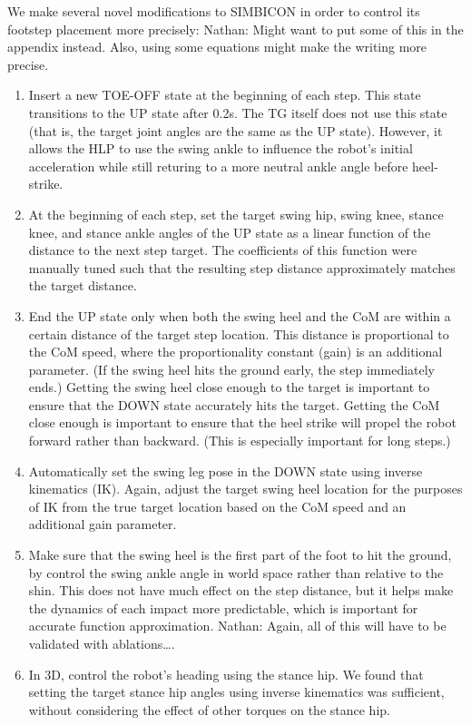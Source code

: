 \documentclass[a4paper]{article}
\newcommand{\nhatch}[1]{{\leavevmode\color{blue} Nathan: #1}}
\begin{document}
We make several novel modifications to SIMBICON in order to control its footstep placement more precisely:
\nhatch{Might want to put some of this in the appendix instead. Also, using some equations might make the writing more precise.}
\begin{enumerate}
  \item Insert a new TOE-OFF state at the beginning of each step.
    This state transitions to the UP state after 0.2s.
    The TG itself does not use this state (that is, the target joint angles are the same as the UP state).
    However, it allows the HLP to use the swing ankle to influence the robot's initial acceleration while still returing to a more neutral ankle angle before heel-strike.

  \item At the beginning of each step, set the target swing hip, swing knee, stance knee, and stance ankle angles of the UP state as a linear function of the distance to the next step target.
    The coefficients of this function were manually tuned such that the resulting step distance approximately matches the target distance.

  \item End the UP state only when both the swing heel and the CoM are within a certain distance of the target step location.
    This distance is proportional to the CoM speed, where the proportionality constant (gain) is an additional parameter.
    (If the swing heel hits the ground early, the step immediately ends.)
    Getting the swing heel close enough to the target is important to ensure that the DOWN state accurately hits the target.
    Getting the CoM close enough is important to ensure that the heel strike will propel the robot forward rather than backward.
    (This is especially important for long steps.)

  \item Automatically set the swing leg pose in the DOWN state using inverse kinematics (IK).
    Again, adjust the target swing heel location for the purposes of IK from the true target location based on the CoM speed and an additional gain parameter.

  \item Make sure that the swing heel is the first part of the foot to hit the ground, by control the swing ankle angle in world space rather than relative to the shin.
    This does not have much effect on the step distance, but it helps make the dynamics of each impact more predictable, which is important for accurate function approximation.
    \nhatch{Again, all of this will have to be validated with ablations\dots.}

  \item In 3D, control the robot's heading using the stance hip.
    We found that setting the target stance hip angles using inverse kinematics was sufficient, without considering the effect of other torques on the stance hip.
\end{enumerate}
\end{document}
